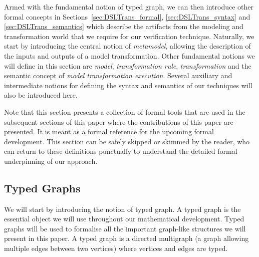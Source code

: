 

Armed with the fundamental notion of typed graph, we can then introduce other formal concepts in Sections~\ref{sec:DSLTrans_formal}, \ref{sec:DSLTrans_syntax} and \ref{sec:DSLTrans_semantics} which describe the artifacts from the modeling and transformation world that we require for our verification technique. Naturally, we start by introducing the central notion of \emph{metamodel}, allowing the description of the inputs and outputs of a model transformation. Other fundamental notions we will define in this section are \emph{model}, \emph{transformation rule}, \emph{transformation} and the semantic concept of \emph{model transformation execution}. Several auxiliary and intermediate notions for defining the syntax and semantics of our techniques will also be introduced here. 

Note that this section presents a collection of formal tools that are used in the subsequent sections of this paper where the contributions of this paper are presented. It is meant as a formal reference for the upcoming formal development. This section can be safely skipped or skimmed by the reader, who can return to these definitions punctually to understand the detailed formal underpinning of our approach. 

    
\subsection{Typed Graphs}
\label{sec:typed_graphs}

 

We will start by introducing the notion of typed graph. A typed graph is the essential object we will use throughout our mathematical development. Typed graphs will be used to formalise all the important graph-like structures we will present in this paper. A typed graph is a directed multigraph (a graph allowing multiple edges between two vertices) where vertices and edges are typed.


